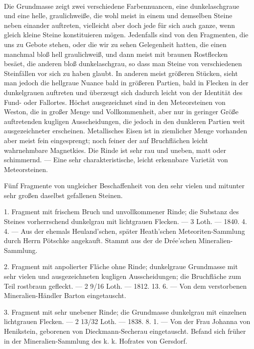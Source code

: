 \documentclass[a4paper, 11pt, oneside, polutonikogreek, german]{article}
\begin{document}
\paragraph{}
Die Grundmasse zeigt zwei verschiedene Farbennuancen, eine dunkelaschgraue und eine helle, graulichweiße, die wohl meist in einem und demselben Steine neben einander auftreten, vielleicht aber doch jede für sich auch ganze, wenn gleich kleine Steine konstituieren mögen. Jedenfalls sind von den Fragmenten, die uns zu Gebote stehen, oder die wir zu sehen Gelegenheit hatten, die einen manchmal bloß hell graulichweiß, und dann meist mit braunen Rostflecken besäet, die anderen bloß dunkelaschgrau, so dass man Steine von verschiedenen Steinfällen vor sich zu haben glaubt. In anderen meist größeren Stücken, sieht man jedoch die hellgraue Nuance bald in größeren Partien, bald in Flecken in der dunkelgrauen auftreten und überzeugt sich dadurch leicht von der Identität des Fund- oder Fallortes. Höchst ausgezeichnet sind in den Meteorsteinen von Weston, die in großer Menge und Vollkommenheit, aber nur in geringer Größe auftretenden kugligen Ausscheidungen, die jedoch in den dunkleren Partien weit ausgezeichneter erscheinen. Metallisches Eisen ist in ziemlicher Menge vorhanden aber meist fein eingesprengt; noch feiner der auf Bruchflächen leicht wahrnehmbare Magnetkies. Die Rinde ist sehr rau und uneben, matt oder schimmernd. — Eine sehr charakteristische, leicht erkennbare Varietät von Meteorsteinen.

Fünf Fragmente von ungleicher Beschaffenheit von den sehr vielen und mitunter sehr großen daselbst gefallenen Steinen.

1. Fragment mit frischem Bruch und unvollkommener Rinde; die Substanz des Steines vorherrschend dunkelgrau mit lichtgrauen Flecken. — 3 Loth. — 1840. 4. 4. — Aus der ehemals Heuland'schen, später Heath'schen Meteoriten-Sammlung durch Herrn Pötschke angekauft. Stammt aus der de Drée'schen Mineralien-Sammlung.

2. Fragment mit anpolierter Fläche ohne Rinde; dunkelgraue Grundmasse mit sehr vielen und ausgezeichneten kugligen Ausscheidungen; die Bruchfläche zum Teil rostbraun gefleckt. — 2 9/16 Loth. — 1812. 13. 6. — Von dem verstorbenen Mineralien-Händler Barton eingetauscht.

3. Fragment mit sehr unebener Rinde; die Grundmasse dunkelgrau mit einzelnen lichtgrauen Flecken. — 2 13/32 Loth. — 1838. 8. 1. — Von der Frau Johanna von Henikstein, geborenen von Dieckmann-Secherau eingetauscht. Befand sich früher in der Mineralien-Sammlung des k. k. Hofrates von Gersdorf.
\end{document}
